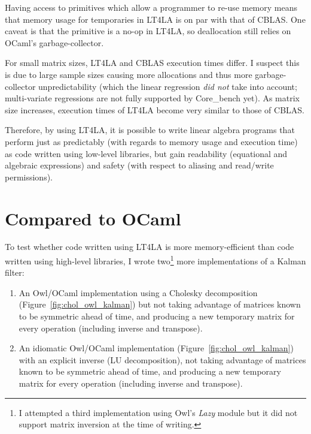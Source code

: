 Having access to primitives which allow a programmer to re-use memory means
that memory usage for temporaries in LT4LA is on par with that of CBLAS. One
caveat is that the  primitive is a no-op in LT4LA, so deallocation
still relies on OCaml's garbage-collector.

For small matrix sizes, LT4LA and CBLAS execution times differ. I suspect this
is due to large sample sizes causing more allocations and thus more
garbage-collector unpredictability (which the linear regression \emph{did not}
take into account; multi-variate regressions are not fully supported by
Core\_bench yet). As matrix size increases, execution times of LT4LA become
very similar to those of CBLAS.

Therefore, by using LT4LA, it is possible to write linear algebra programs that
perform just as predictably (with regards to memory usage and execution time)
as code written using low-level libraries, but gain readability (equational and
algebraic expressions) and safety (with respect to aliasing
and read/write permissions).

\section{Compared to OCaml}

To test whether code written using LT4LA is more memory-efficient than code
written using high-level libraries, I wrote two\footnote{I attempted a third
implementation using Owl's \emph{Lazy} module but it did not support matrix
inversion at the time of writing.} more implementations of a Kalman filter:

\begin{enumerate}
    \item An Owl/OCaml implementation using a Cholesky decomposition
        (Figure~\ref{fig:chol_owl_kalman}) but not taking advantage of matrices
        known to be symmetric ahead of time, and producing a new temporary
        matrix for every operation (including inverse and transpose).

    \item An idiomatic Owl/OCaml implementation
        (Figure~\ref{fig:chol_owl_kalman}) with an explicit inverse (LU
        decomposition), not taking advantage of matrices known to be symmetric
        ahead of time, and producing a new temporary matrix for every operation
        (including inverse and transpose).
\end{enumerate}

